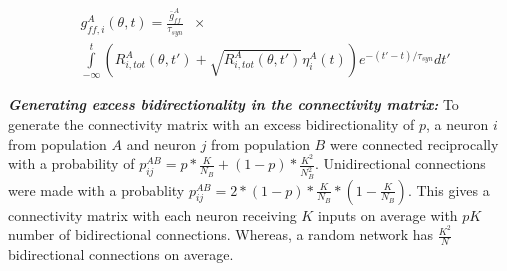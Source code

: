 \begin{equation} 
\begin{split}
& g_{ff, i}^{A} (\theta, t)  = \frac{\bar{g}^{A}_{ff}}{\tau_{syn}} \;\; \times \\
& \int\limits_{-\infty}^{t}  \left( R_{i, tot}^{A} (\theta, t') + \sqrt{R_{i, tot}^{A} (\theta, t')}  \eta^{A}_{i}(t) \right) e^{-(t' - t) /\tau_{syn}} dt' 
\end{split}
\end{equation}


\textbf{\textit{Generating excess bidirectionality in the connectivity matrix:}}
To generate the connectivity matrix with an excess bidirectionality of $p$, a neuron $i$ from population $A$ and neuron $j$ from population $B$  were connected reciprocally with a  probability of $p_{ij}^{AB} = p * \frac{K}{N_{B}} + (1 - p) * \frac{K^2}{N_{B}^2}$. 
Unidirectional connections were  made with a probablity $p_{ij}^{AB}  = 2 * (1 - p) * \frac{K}{N_{B}} * (1 -  \frac{K}{N_{B}})$. This gives a connectivity matrix with each neuron receiving $K$ inputs on average with $pK$ number of bidirectional connections. Whereas, a random network has $\frac{K^2}{N}$ bidirectional connections on average.

